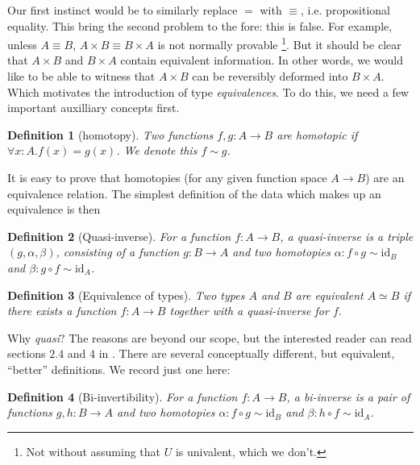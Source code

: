 \documentclass{article}
\newtheorem{defn}{Definition}[section]
\begin{document}
Our first instinct would be to similarly replace $=$ with
$\equiv$, i.e. propositional equality. This bring the second
problem to the fore: this is false. For example, unless $A \equiv B$,
$A \times B \equiv B \times A$ is not normally provable%
\footnote{Not without assuming that $U$ is univalent, which we
don't.}. But it should be clear that $A \times B$ and $B \times A$
contain equivalent information. In other words, we would like to
be able to witness that $A \times B$ can be reversibly deformed
into $B \times A$. Which motivates the introduction of 
type \emph{equivalences}. To do this, we need a few important
auxilliary concepts first.

\begin{defn}[homotopy]
\label{def:homotopy}
Two functions $f,g:A \rightarrow B$ are \emph{homotopic} if
$\forall x:A. f(x) = g(x)$. We denote this $f \sim g$.
\end{defn}

\noindent It is easy to prove that homotopies (for any given function
space $A \rightarrow B$) are an equivalence relation.  The simplest
definition of the data which makes up an equivalence is then

\begin{defn}[Quasi-inverse]
\label{def:quasi}
For a function $f : A \rightarrow B$, a \emph{quasi-inverse} is a
triple $(g, \alpha, \beta)$, consisting of a function
$g : B \rightarrow A$ and two homotopies
$\alpha : f \circ g \sim \mathrm{id}_B$ and
$\beta : g \circ f \sim \mathrm{id}_A$.
\end{defn}
 
\begin{defn}[Equivalence of types]
  Two types $A$ and $B$ are equivalent $A \simeq B$ if there exists a
  function $f : A \rightarrow B$ together with a quasi-inverse for $f$.
\end{defn}

\noindent Why \emph{quasi}? The reasons are beyond our scope, but
the interested reader can read sections $2.4$ and $4$ in \cite{hott-book}.
There are several conceptually different, but equivalent, 
``better'' definitions.  We record just one here:

\begin{defn}[Bi-invertibility]
\label{def:biinv}
For a function $f : A \rightarrow B$, a \emph{bi-inverse} is a
pair of functions $g,h : B \rightarrow A$ and two homotopies
$\alpha : f \circ g \sim \mathrm{id}_B$ and
$\beta : h \circ f \sim \mathrm{id}_A$.
\end{defn}
 
\end{document}
